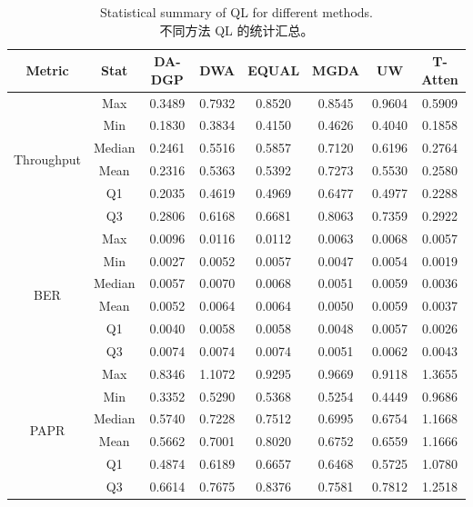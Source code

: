 \documentclass[11pt]{article}
\newcommand{\bicaption}[2]{\caption[#1]{#1\protect\\#2}}
\begin{document}
\begin{table}[!h]
	\centering
	\bicaption{Statistical summary of QL for different methods.}{不同方法 QL 的统计汇总。}
	\label{tab:quality_loss_results}
	\begin{tabular*}{\textwidth}{@{\extracolsep{\fill}}cccccccc}
		\toprule
		\textbf{Metric} & \textbf{Stat} & \textbf{DA-DGP} & \textbf{DWA} & \textbf{EQUAL} & \textbf{MGDA} & \textbf{UW} & \textbf{T-Atten} \\
		\midrule
		\multirow{6}{*}{Throughput} 
		& Max    & 0.3489 & 0.7932 & 0.8520 & 0.8545 & 0.9604 & 0.5909 \\
		& Min    & 0.1830 & 0.3834 & 0.4150 & 0.4626 & 0.4040 & 0.1858 \\
		& Median & 0.2461 & 0.5516 & 0.5857 & 0.7120 & 0.6196 & 0.2764 \\
		& Mean   & 0.2316 & 0.5363 & 0.5392 & 0.7273 & 0.5530 & 0.2580 \\
		& Q1     & 0.2035 & 0.4619 & 0.4969 & 0.6477 & 0.4977 & 0.2288 \\
		& Q3     & 0.2806 & 0.6168 & 0.6681 & 0.8063 & 0.7359 & 0.2922 \\
		\midrule
		\multirow{6}{*}{BER} 
		& Max    & 0.0096 & 0.0116 & 0.0112 & 0.0063 & 0.0068 & 0.0057 \\
		& Min    & 0.0027 & 0.0052 & 0.0057 & 0.0047 & 0.0054 & 0.0019 \\
		& Median & 0.0057 & 0.0070 & 0.0068 & 0.0051 & 0.0059 & 0.0036 \\
		& Mean   & 0.0052 & 0.0064 & 0.0064 & 0.0050 & 0.0059 & 0.0037 \\
		& Q1     & 0.0040 & 0.0058 & 0.0058 & 0.0048 & 0.0057 & 0.0026 \\
		& Q3     & 0.0074 & 0.0074 & 0.0074 & 0.0051 & 0.0062 & 0.0043 \\
		\midrule
		\multirow{6}{*}{PAPR}    
		& Max    & 0.8346 & 1.1072 & 0.9295 & 0.9669 & 0.9118 & 1.3655 \\
		& Min    & 0.3352 & 0.5290 & 0.5368 & 0.5254 & 0.4449 & 0.9686 \\
		& Median & 0.5740 & 0.7228 & 0.7512 & 0.6995 & 0.6754 & 1.1668 \\
		& Mean   & 0.5662 & 0.7001 & 0.8020 & 0.6752 & 0.6559 & 1.1666 \\
		& Q1     & 0.4874 & 0.6189 & 0.6657 & 0.6468 & 0.5725 & 1.0780 \\
		& Q3     & 0.6614 & 0.7675 & 0.8376 & 0.7581 & 0.7812 & 1.2518 \\
		\bottomrule
	\end{tabular*}
\end{table}
\end{document}
